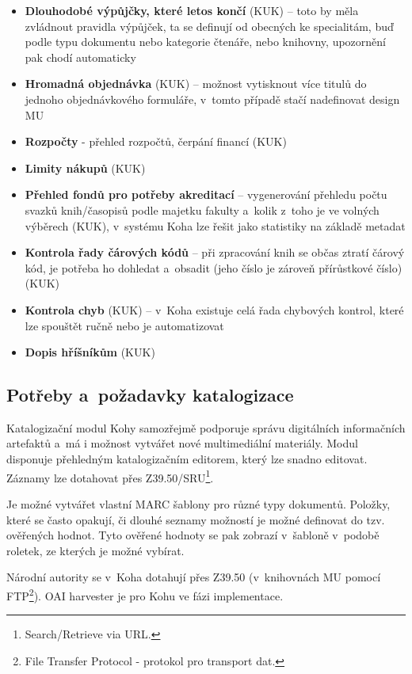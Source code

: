 \documentclass[
	11pt, oneside, printed, final, palatino
	microtype,
	table,   %
	lof,     %
	lot     %
]{fithesis3}
\newcommand{\bold}[1]{\textbf{#1}}
\begin{document}
{\begin{itemize}
\item \bold{Dlouhodobé výpůjčky, které letos končí} (KUK) – toto by měla zvládnout pravidla výpůjček, ta se definují od obecných ke specialitám, buď podle typu dokumentu nebo kategorie čtenáře, nebo knihovny, upozornění pak chodí automaticky
\item \bold{Hromadná objednávka} (KUK) – možnost vytisknout více titulů do jednoho objednávkového formuláře, v~tomto případě stačí nadefinovat design MU
\item \bold{Rozpočty} - přehled rozpočtů, čerpání financí (KUK)
\item \bold{Limity nákupů} (KUK)
\item \bold{Přehled fondů pro potřeby akreditací} – vygenerování přehledu počtu svazků knih/časopisů podle majetku fakulty a~kolik z~toho je ve volných výběrech (KUK), v~systému Koha lze řešit jako statistiky na základě metadat
\item \bold{Kontrola řady čárových kódů} – při zpracování knih se občas ztratí čárový kód, je potřeba ho dohledat a~obsadit (jeho číslo je zároveň přírůstkové číslo) (KUK)
\item \bold{Kontrola chyb} (KUK) – v~Koha existuje celá řada chybových kontrol, které lze spouštět ručně nebo je automatizovat
\item \bold{Dopis hříšníkům} (KUK)
\end{itemize}

\subsection{Potřeby a~požadavky katalogizace}

Katalogizační modul Kohy samozřejmě podporuje správu digitálních informačních artefaktů a~má i možnost vytvářet nové multimediální materiály. Modul disponuje přehledným katalogizačním editorem, který lze snadno editovat. Záznamy lze dotahovat přes Z39.50/SRU\footnote{Search/Retrieve via URL.}. 

Je možné vytvářet vlastní MARC šablony pro různé typy dokumentů. Položky, které se často opakují, či dlouhé seznamy možností je možné definovat do tzv. ověřených hodnot. Tyto ověřené hodnoty se pak zobrazí v~šabloně v~podobě roletek, ze kterých je možné vybírat.

Národní autority se v~Koha dotahují přes Z39.50 (v~knihovnách MU pomocí FTP\footnote{File Transfer Protocol - protokol pro transport dat.}). OAI harvester je pro Kohu ve fázi implementace.

}
\end{document}
